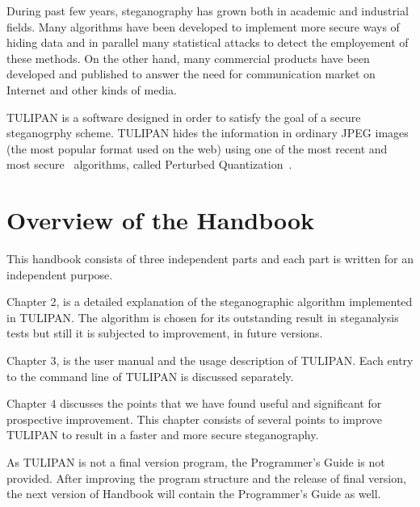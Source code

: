  During past few years, steganography has grown both in academic and industrial fields. Many algorithms have been developed to implement more secure ways of hiding data and in parallel many statistical attacks to detect the employement of these methods. On the other hand, many commercial products have been developed and published to answer the need for communication market on Internet and other kinds of media.

TULIPAN is a software designed in order to satisfy the goal of a secure steganogrphy scheme. TULIPAN hides the information in ordinary JPEG images (the most popular format used on the web) using one of the most recent and most secure~\cite{Kh04} algorithms, called Perturbed Quantization~\cite{PQ04}.

\section{Overview of the Handbook}

This handbook consists of three independent parts and each part is written for an independent purpose.

Chapter 2, is a detailed explanation of the steganographic algorithm implemented in TULIPAN. The algorithm is chosen for its outstanding result in steganalysis tests but still it is subjected to improvement, in future versions.
 
Chapter 3, is the user manual and the usage description of TULIPAN. Each entry to the command line of TULIPAN is discussed separately.

Chapter 4 discusses the points that we have found useful and significant for prospective improvement. This chapter consists of several points to improve TULIPAN to result in a faster and more secure steganography.


As TULIPAN is not a final version program, the Programmer's Guide is not provided. After improving the program structure and the release of final version, the next version of Handbook will contain the Programmer's Guide as well.

